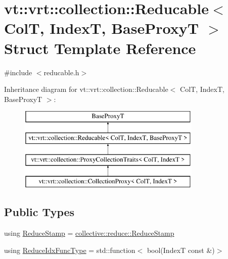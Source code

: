 \hypertarget{structvt_1_1vrt_1_1collection_1_1_reducable}{}\section{vt\+:\+:vrt\+:\+:collection\+:\+:Reducable$<$ ColT, IndexT, Base\+ProxyT $>$ Struct Template Reference}
\label{structvt_1_1vrt_1_1collection_1_1_reducable}


{\ttfamily \#include $<$reducable.\+h$>$}

Inheritance diagram for vt\+:\+:vrt\+:\+:collection\+:\+:Reducable$<$ ColT, IndexT, Base\+ProxyT $>$\+:\begin{figure}[H]
\begin{center}
\leavevmode
\includegraphics[height=4.000000cm]{structvt_1_1vrt_1_1collection_1_1_reducable}
\end{center}
\end{figure}
\subsection*{Public Types}
\begin{DoxyCompactItemize}
\item 
using \hyperlink{structvt_1_1vrt_1_1collection_1_1_reducable_a19f80baf23f36dad4948ef07322fd0cb}{Reduce\+Stamp} = \hyperlink{namespacevt_1_1collective_1_1reduce_a7b7cb3021ac5654d92825d9fab0250b2}{collective\+::reduce\+::\+Reduce\+Stamp}
\item 
using \hyperlink{structvt_1_1vrt_1_1collection_1_1_reducable_a9f5a6c385efafe1fa52937f4809a9486}{Reduce\+Idx\+Func\+Type} = std\+::function$<$ bool(IndexT const  \&)$>$
\end{DoxyCompactItemize}
